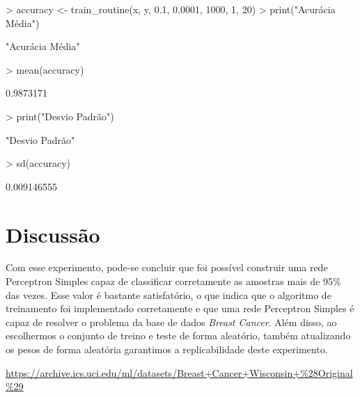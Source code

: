 \documentclass[12pt]{article}
\begin{document}
\begin{Schunk}
\begin{Sinput}
> accuracy <- train_routine(x, y, 0.1, 0.0001, 1000, 1, 20)
> print("Acurácia Média")
\end{Sinput}
\begin{Soutput}
[1] "Acurácia Média"
\end{Soutput}
\begin{Sinput}
> mean(accuracy)
\end{Sinput}
\begin{Soutput}
[1] 0.9873171
\end{Soutput}
\begin{Sinput}
> print("Desvio Padrão")
\end{Sinput}
\begin{Soutput}
[1] "Desvio Padrão"
\end{Soutput}
\begin{Sinput}
> sd(accuracy)
\end{Sinput}
\begin{Soutput}
[1] 0.009146555
\end{Soutput}
\end{Schunk}

\section{Discussão}

  \par Com esse experimento, pode-se concluir que foi possível construir uma rede Perceptron Simples capaz de classificar corretamente as amostras mais de 95\% das vezes. Esse valor é bastante satisfatório, o que indica que o algoritmo de treinamento foi implementado corretamente e que uma rede Perceptron Simples é capaz de resolver o problema da base de dados \textit{Breast Cancer}. Além disso, ao escolhermos o conjunto de treino e teste  de forma aleatório, também atualizando os pesos de forma aleatória garantimos a replicabilidade deste experimento. 



\begin{thebibliography}{99}
		\label{BreastCancer} \url{https://archive.ics.uci.edu/ml/datasets/Breast+Cancer+Wisconsin+\%28Original\%29}
\end{thebibliography}	
\end{document}
